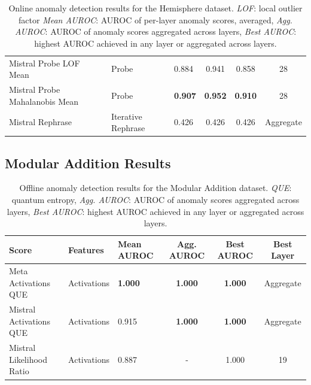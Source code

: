 \begin{table}[H]
\begin{tabular}{lp{3cm}lccc}
Mistral Probe LOF Mean               & Probe                  & 0.884  & 0.941  & 0.858  & 28 \\ 
Mistral Probe Mahalanobis Mean       & Probe                  & \textbf{0.907}  & \textbf{0.952}  & \textbf{0.910}  & 28 \\ 
Mistral Rephrase                     & Iterative Rephrase     & 0.426  & 0.426  & 0.426  & Aggregate \\ 
\bottomrule
\end{tabular}
\caption{Online anomaly detection results for the Hemisphere dataset. \emph{LOF}: local outlier factor \emph{Mean AUROC}: AUROC of per-layer anomaly scores, averaged, \emph{Agg. AUROC}: AUROC of anomaly scores aggregated across layers, \emph{Best AUROC}: highest AUROC achieved in any layer or aggregated across layers.}
\label{tab:online_anomaly_hemisphere}
\end{table}



\subsection{Modular Addition Results}

\begin{table}[H]
\centering
\scriptsize  %
\renewcommand{\arraystretch}{1.2}  %
\setlength{\tabcolsep}{2pt}  %
\begin{tabular}{lp{3cm}lccc}
\toprule
\textbf{Score} & \textbf{Features} & \textbf{Mean AUROC} & \textbf{Agg. AUROC} & \textbf{Best AUROC} & \textbf{Best Layer} \\
\midrule
Meta Activations QUE     & Activations & \textbf{1.000}  & \textbf{1.000}  & \textbf{1.000}  & Aggregate \\ 
Mistral Activations QUE  & Activations & 0.915  & \textbf{1.000}  & \textbf{1.000}  & Aggregate \\ 
Mistral Likelihood Ratio & Activations & 0.887  & -      & 1.000  & 19 \\ 
\bottomrule
\end{tabular}
\caption{Offline anomaly detection results for the Modular Addition dataset. \emph{QUE}: quantum entropy, \emph{Agg. AUROC}: AUROC of anomaly scores aggregated across layers, \emph{Best AUROC}: highest AUROC achieved in any layer or aggregated across layers.}
\label{tab:offline_anomaly_modular_addition}
\end{table}


